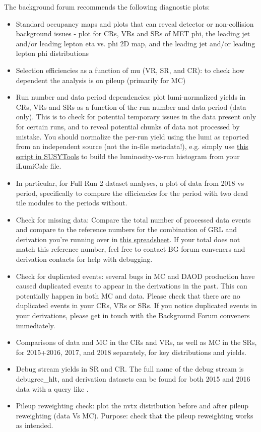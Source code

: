 The background forum recommends the following diagnostic plots:
\begin{itemize}
\item Standard occupancy maps and plots that can reveal detector or non-collision background issues - plot for CRs, VRs and SRs of MET phi, the leading jet and/or leading lepton eta vs. phi 2D map, and the leading jet and/or leading lepton phi distributions
\item Selection efficiencies as a function of mu (VR, SR, and CR): to check how dependent the analysis is on pileup (primarily for MC)
\item Run number and data period dependencies: plot lumi-normalized yields in CRs, VRs and SRs as a function of the run number and data period (data only). This is to check for potential temporary issues in the data present only for certain runs, and to reveal potential chunks of data not processed by mistake. You should normalize the per-run yield using the lumi as reported from an independent source (not the in-file metadata!), e.g. simply use \href{https://svnweb.cern.ch/trac/atlasoff/browser/PhysicsAnalysis/SUSYPhys/SUSYTools/trunk/scripts/ilumi2histo.py}{this script in SUSYTools} to build the luminosity-vs-run histogram from your iLumiCalc file.
\item In particular, for Full Run 2 dataset analyses, a plot of data from 2018 vs period, specifically to compare the efficiencies for the period with two dead tile modules to the periods without.
\item Check for missing data: Compare the total number of processed data events and compare to the reference numbers for the combination of GRL and derivation you're running over in \href{https://docs.google.com/spreadsheets/d/1LMioo0nvALkKgoCKRW_ihQThHyVwcOQVRJe4aXiENUs/edit#gid=424865170}{this spreadsheet}. If your total does not match this reference number, feel free to contact BG forum conveners and derivation contacts for help with debugging.
\item Check for duplicated events: several bugs in MC and DAOD production have caused duplicated events to appear in the derivations in the past. This can potentially happen in both MC and data. Please check that there are no duplicated events in your CRs, VRs or SRs. If you notice duplicated events in your derivations, please get in touch with the Background Forum conveners immediately.
\item Comparisons of data and MC in the CRs and VRs, as well as MC in the SRs, for 2015+2016, 2017, and 2018 separately, for key distributions and yields.
\item Debug stream yields in SR and CR. The full name of the debug stream is debugrec\_hlt, and derivation datasets can be found for both 2015 and 2016 data with a query like .
\item Pileup reweighting check: plot the nvtx distribution before and after pileup reweighting (data Vs MC). Purpose: check that the pileup reweighting works as intended.
\end{itemize}

